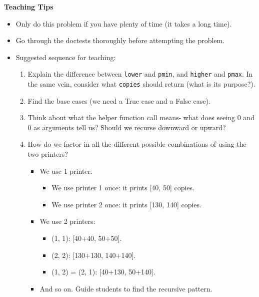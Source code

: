\begin{guide}
\begin{blocksection}
\textbf{Teaching Tips}
\begin{itemize}
    \item Only do this problem if you have plenty of time (it takes a long time).
    \item Go through the doctests thoroughly before attempting the problem.
    \item Suggested sequence for teaching:
    \begin{enumerate}
        \item Explain the difference between \lstinline{lower} and \lstinline{pmin}, and \lstinline{higher} and \lstinline{pmax}. In the same vein, consider what \lstinline{copies} should return (what is its purpose?).
        \item Find the base cases (we need a True case and a False case).
        \item Think about what the helper function call means- what does seeing 0 and 0 as arguments tell us? Should we recurse downward or upward?
        \item How do we factor in all the different possible combinations of using the two printers?
        \begin{itemize}
            \item We use 1 printer.
            \begin{itemize}
                \item We use printer 1 once: it prints [40, 50] copies.
                \item We use printer 2 once: it prints [130, 140] copies.
            \end{itemize}
            \item We use 2 printers:
            \begin{itemize}
                \item (1, 1): [40+40, 50+50].
                \item (2, 2): [130+130, 140+140].
                \item (1, 2) = (2, 1): [40+130, 50+140].
            \end{itemize}
            \item And so on. Guide students to find the recursive pattern.

        \end{itemize}
    \end{enumerate}
\end{itemize}
\end{blocksection}
\end{guide}
